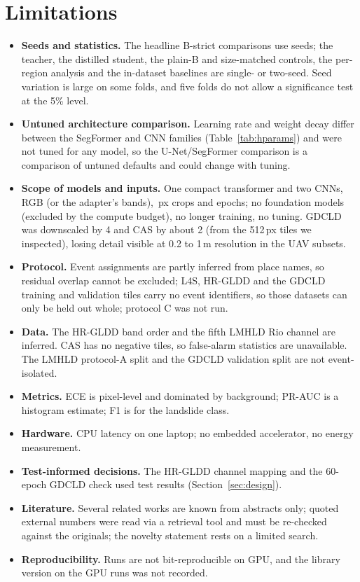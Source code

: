 \documentclass[11pt]{article}
\begin{document}
\section{Limitations}\label{sec:limits}
\begin{itemize}\setlength\itemsep{0pt}
\item \textbf{Seeds and statistics.} The headline B-strict comparisons use \NumSeeds{} seeds; the teacher, the distilled student, the plain-B and size-matched controls, the per-region analysis and the in-dataset baselines are single- or two-seed. Seed variation is large on some folds, and five folds do not allow a significance test at the 5\% level.
\item \textbf{Untuned architecture comparison.} Learning rate and weight decay differ between the SegFormer and CNN families (Table~\ref{tab:hparams}) and were not tuned for any model, so the U-Net/SegFormer comparison is a comparison of untuned defaults and could change with tuning.
\item \textbf{Scope of models and inputs.} One compact transformer and two CNNs, RGB (or the adapter's bands), \XdCrop\,px crops and \XdEpochs{} epochs; no foundation models (excluded by the compute budget), no longer training, no tuning. GDCLD was downscaled by 4 and CAS by about 2 (from the 512\,px tiles we inspected), losing detail visible at 0.2 to 1\,m resolution in the UAV subsets.
\item \textbf{Protocol.} Event assignments are partly inferred from place names, so residual overlap cannot be excluded; L4S, HR-GLDD and the GDCLD training and validation tiles carry no event identifiers, so those datasets can only be held out whole; protocol C was not run.
\item \textbf{Data.} The HR-GLDD band order and the fifth LMHLD Rio channel are inferred. CAS has no negative tiles, so false-alarm statistics are unavailable. The LMHLD protocol-A split and the GDCLD validation split are not event-isolated.
\item \textbf{Metrics.} ECE is pixel-level and dominated by background; PR-AUC is a histogram estimate; F1 is for the landslide class.
\item \textbf{Hardware.} CPU latency on one laptop; no embedded accelerator, no energy measurement.
\item \textbf{Test-informed decisions.} The HR-GLDD channel mapping and the 60-epoch GDCLD check used test results (Section~\ref{sec:design}).
\item \textbf{Literature.} Several related works are known from abstracts only; quoted external numbers were read via a retrieval tool and must be re-checked against the originals; the novelty statement rests on a limited search.
\item \textbf{Reproducibility.} Runs are not bit-reproducible on GPU, and the library version on the GPU runs was not recorded.
\end{itemize}
\end{document}
